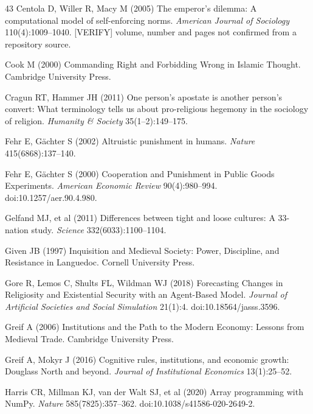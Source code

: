 \documentclass[12pt]{article}
\begin{document}
\begin{thebibliography}{43}
Centola D, Willer R, Macy M (2005) The emperor's dilemma: A computational model of self-enforcing norms. \textit{American Journal of Sociology} 110(4):1009--1040. [VERIFY] volume, number and pages not confirmed from a repository source.

Cook M (2000) Commanding Right and Forbidding Wrong in Islamic Thought. Cambridge University Press.

Cragun RT, Hammer JH (2011) One person's apostate is another person's convert: What terminology tells us about pro-religious hegemony in the sociology of religion. \textit{Humanity \& Society} 35(1--2):149--175.

Fehr E, G\"achter S (2002) Altruistic punishment in humans. \textit{Nature} 415(6868):137--140.

Fehr E, G\"{a}chter S (2000) Cooperation and Punishment in Public Goods Experiments. \textit{American Economic Review} 90(4):980--994. doi:10.1257/aer.90.4.980.

Gelfand MJ, et al (2011) Differences between tight and loose cultures: A 33-nation study. \textit{Science} 332(6033):1100--1104.

Given JB (1997) Inquisition and Medieval Society: Power, Discipline, and Resistance in Languedoc. Cornell University Press.

Gore R, Lemos C, Shults FL, Wildman WJ (2018) Forecasting Changes in Religiosity and Existential Security with an Agent-Based Model. \textit{Journal of Artificial Societies and Social Simulation} 21(1):4. doi:10.18564/jasss.3596.

Greif A (2006) Institutions and the Path to the Modern Economy: Lessons from Medieval Trade. Cambridge University Press.

Greif A, Mokyr J (2016) Cognitive rules, institutions, and economic growth: Douglass North and beyond. \textit{Journal of Institutional Economics} 13(1):25--52.

Harris CR, Millman KJ, van der Walt SJ, et al (2020) Array programming with NumPy. \textit{Nature} 585(7825):357--362. doi:10.1038/s41586-020-2649-2.


\end{thebibliography}
\end{document}

